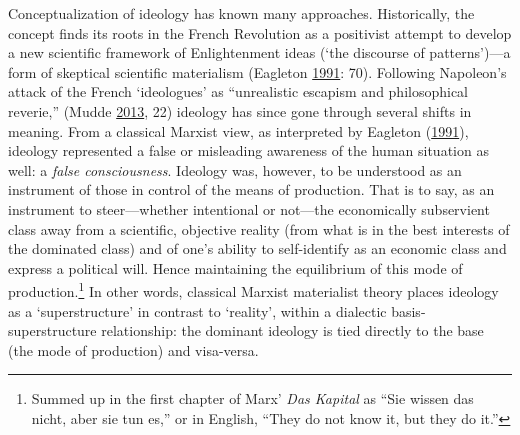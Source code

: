 \documentclass[10pt,british,A4paper,twoside]{memoir}
\begin{document}
Conceptualization of ideology has known many approaches. Historically,
the concept finds its roots in the French Revolution as a positivist
attempt to develop a new scientific framework of Enlightenment ideas
(`the discourse of patterns')---a form of skeptical scientific
materialism (Eagleton
\protect\hyperlink{ref-eagleton_ideology:_1991}{1991}: 70). Following
Napoleon's attack of the French `ideologues' as ``unrealistic escapism
and philosophical reverie,'' (Mudde
\protect\hyperlink{ref-mudde_oxford_2013}{2013}, 22) ideology has since
gone through several shifts in meaning. From a classical Marxist view,
as interpreted by Eagleton
(\protect\hyperlink{ref-eagleton_ideology:_1991}{1991}), ideology
represented a false or misleading awareness of the human situation as
well: a \emph{false consciousness}. Ideology was, however, to be
understood as an instrument of those in control of the means of
production. That is to say, as an instrument to steer---whether
intentional or not---the economically subservient class away from a
scientific, objective reality (from what is in the best interests of the
dominated class) and of one's ability to self-identify as an economic
class and express a political will. Hence maintaining the equilibrium of
this mode of production.\footnote{Summed up in the first chapter of
  Marx' \emph{Das Kapital} as ``Sie wissen das nicht, aber sie tun es,''
  or in English, ``They do not know it, but they do it.''} In other
words, classical Marxist materialist theory places ideology as a
`superstructure' in contrast to `reality', within a dialectic
basis-superstructure relationship: the dominant ideology is tied
directly to the base (the mode of production) and visa-versa.
\end{document}
